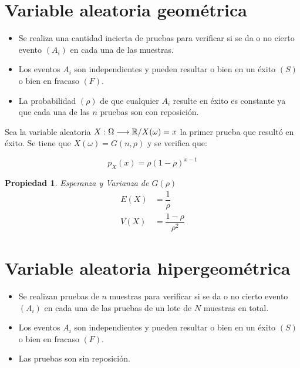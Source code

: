 \documentclass[a5paper,12pt,twoside]{book}
\newtheorem{prop}{{Propiedad}}[chapter]
\begin{document}
\section{Variable aleatoria geométrica}

\begin{itemize}
\item Se realiza una cantidad incierta de pruebas para verificar si se da o no cierto evento $(A_i)$ en cada una de las muestras.

\item Los eventos $A_i$ son independientes y pueden resultar o bien en un éxito $(S)$ o bien en fracaso $(F)$.

\item La probabilidad $(\rho)$ de que cualquier $A_i$ resulte en éxito es constante ya que cada una de las $n$ pruebas son con reposición.
\end{itemize}

Sea la variable aleatoria $X:\Omega \longrightarrow \mathbb{R}/X(\omega)=x$ la primer prueba que resultó en éxito. Se tiene que $X(\omega)=G(n,\rho)$ y se verifica que:

\begin{equation}
p_X(x)=
\rho (1-\rho)^{x-1}
\end{equation}

\begin{prop}
Esperanza y Varianza de $G(\rho)$
\begin{equation}
\begin{split}
E(X) &= \dfrac{1}{\rho}
\\
V(X) &= \dfrac{1-\rho}{\rho^2}
\end{split}
\end{equation}
\end{prop}

\section{Variable aleatoria hipergeométrica}

\begin{itemize}
\item Se realizan pruebas de $n$ muestras para verificar si se da o no cierto evento $(A_i)$ en cada una de las pruebas de un lote de $N$ muestras en total.

\item Los eventos $A_i$ son independientes y pueden resultar o bien en un éxito $(S)$ o bien en fracaso $(F)$.

\item Las pruebas son sin reposición.
\end{itemize}
\end{document}
